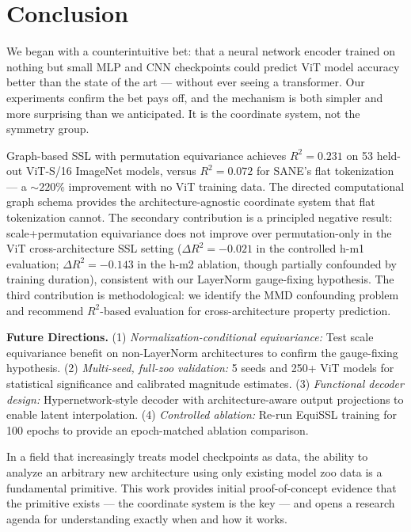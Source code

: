 \section{Conclusion}
\label{sec:conclusion}

We began with a counterintuitive bet:
that a neural network encoder trained on nothing but small MLP and CNN checkpoints
could predict ViT model accuracy better than the state of the art ---
without ever seeing a transformer.
Our experiments confirm the bet pays off, and the mechanism is both simpler and more
surprising than we anticipated.
It is the coordinate system, not the symmetry group.

Graph-based SSL with permutation equivariance achieves $R^2 = 0.231$ on 53 held-out
ViT-S/16 ImageNet models, versus $R^2 = 0.072$ for SANE's flat tokenization ---
a ${\sim}220\%$ improvement with no ViT training data.
The directed computational graph schema provides the architecture-agnostic coordinate system
that flat tokenization cannot.
The secondary contribution is a principled negative result:
scale+permutation equivariance does not improve over permutation-only in the ViT
cross-architecture SSL setting ($\Delta R^2 = -0.021$ in the controlled h-m1 evaluation;
$\Delta R^2 = -0.143$ in the h-m2 ablation, though partially confounded by training duration),
consistent with our LayerNorm gauge-fixing hypothesis.
The third contribution is methodological:
we identify the MMD confounding problem and recommend $R^2$-based evaluation for
cross-architecture property prediction.

\textbf{Future Directions.}
(1) \emph{Normalization-conditional equivariance:}
Test scale equivariance benefit on non-LayerNorm architectures to confirm the gauge-fixing
hypothesis.
(2) \emph{Multi-seed, full-zoo validation:}
5 seeds and 250+ ViT models for statistical significance and calibrated magnitude estimates.
(3) \emph{Functional decoder design:}
Hypernetwork-style decoder with architecture-aware output projections to enable latent
interpolation.
(4) \emph{Controlled ablation:}
Re-run EquiSSL training for 100 epochs to provide an epoch-matched ablation comparison.

In a field that increasingly treats model checkpoints as data,
the ability to analyze an arbitrary new architecture using only existing model zoo data is
a fundamental primitive.
This work provides initial proof-of-concept evidence that the primitive exists ---
the coordinate system is the key ---
and opens a research agenda for understanding exactly when and how it works.

